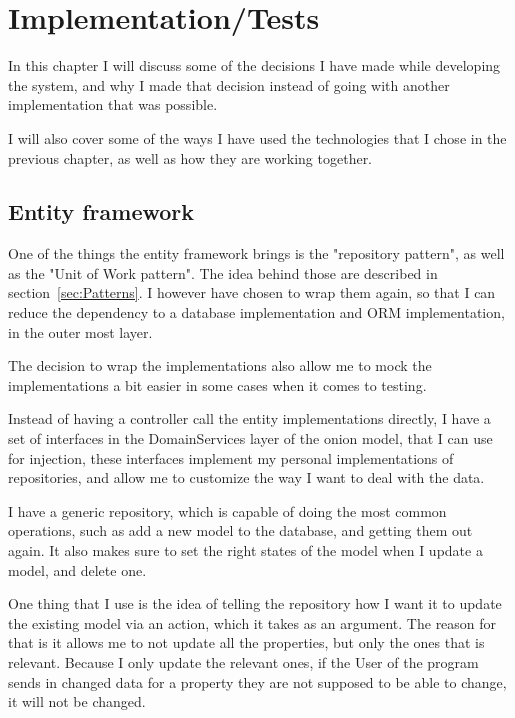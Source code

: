 \chapter{Implementation/Tests}
\label{chap:Implementation}

In this chapter I will discuss some of the decisions I have made while developing the system, and why I made that decision instead of going with another implementation that was possible.

I will also cover some of the ways I have used the technologies that I chose in the previous chapter, as well as how they are working together.

\section{Entity framework}
\label{sec:Entity framework}
One of the things the entity framework brings is the "repository pattern", as well as the "Unit of Work pattern". The idea behind those are described in section~\ref{sec:Patterns}. I however have chosen to wrap them again, so that I can reduce the dependency to a database implementation and ORM implementation, in the outer most layer.

The decision to wrap the implementations also allow me to mock the implementations a bit easier in some cases when it comes to testing.

Instead of having a controller call the entity implementations directly, I have a set of interfaces in the DomainServices layer of the onion model, that I can use for injection, these interfaces implement my personal implementations of repositories, and allow me to customize the way I want to deal with the data.

I have a generic repository, which is capable of doing the most common operations, such as add a new model to the database, and getting them out again. It also makes sure to set the right states of the model when I update a model, and delete one.

One thing that I use is the idea of telling the repository how I want it to update the existing model via an action, which it takes as an argument. The reason for that is it allows me to not update all the properties, but only the ones that is relevant. Because I only update the relevant ones, if the User of the program sends in changed data for a property they are not supposed to be able to change, it will not be changed.


